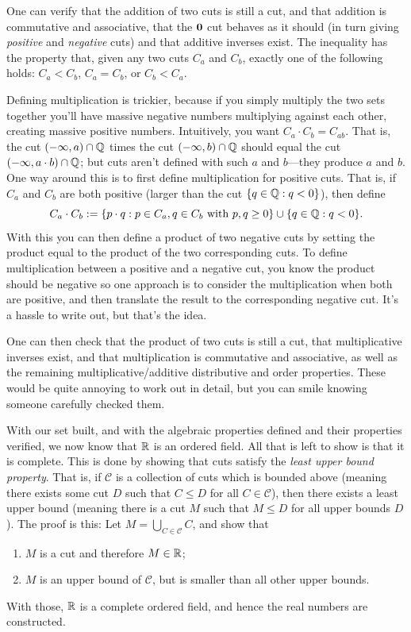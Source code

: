 \documentclass[11pt,twoside=off,numbers=noenddot]{scrbook}
\begin{document}
\begin{proofsketch}
    One can verify that the addition of two cuts is still a cut, and that addition is commutative and associative, that the $\textbf{0}$ cut behaves as it should (in turn giving \textit{positive} and \textit{negative} cuts) and that additive inverses exist. The inequality has the property that, given any two cuts $C_a$ and $C_b$, exactly one of the following holds: $C_a < C_b$, $C_a = C_b$, or $C_b < C_a$.

    Defining multiplication is trickier, because if you simply multiply the two sets together you'll have massive negative numbers multiplying against each other, creating massive positive numbers. Intuitively, you want $C_a \cdot C_b = C_{ab}$. That is, the cut $(-\infty, a) \cap \mathbb Q$ times the cut $(-\infty, b) \cap \mathbb Q$ should equal the cut $(-\infty, a \cdot b) \cap \mathbb Q$; but cuts aren't defined with such $a$ and $b$—they produce $a$ and $b$. One way around this is to first define multiplication for positive cuts. That is, if $C_a$ and $C_b$ are both positive (larger than the cut $\{ q \in \mathbb Q : q < 0 \}$), then define
    \[ C_a \cdot C_b := \{ p \cdot q : p \in C_a, q \in C_b \text{ with } p, q \geq 0 \} \cup \{ q \in \mathbb Q : q < 0 \}. \]
    With this you can then define a product of two negative cuts by setting the product equal to the product of the two corresponding cuts. To define multiplication between a positive and a negative cut, you know the product should be negative so one approach is to consider the multiplication when both are positive, and then translate the result to the corresponding negative cut. It's a hassle to write out, but that's the idea.

    One can then check that the product of two cuts is still a cut, that multiplicative inverses exist, and that multiplication is commutative and associative, as well as the remaining multiplicative/additive distributive and order properties. These would be quite annoying to work out in detail, but you can smile knowing someone carefully checked them.

    With our set built, and with the algebraic properties defined and their properties verified, we now know that $\mathbb R$ is an ordered field. All that is left to show is that it is complete. This is done by showing that cuts satisfy the \textit{least upper bound property}. That is, if $\mathcal{C}$ is a collection of cuts which is bounded above (meaning there exists some cut $D$ such that $C \leq D$ for all $C \in \mathcal{C}$), then there exists a least upper bound (meaning there is a cut $M$ such that $M \leq D$ for all upper bounds $D$). The proof is this: Let $M = \bigcup_{C \in \mathcal{C}} C$, and show that
    \begin{enumerate}
        \item $M$ is a cut and therefore $M \in \mathbb R$;
        \item $M$ is an upper bound of $\mathcal{C}$, but is smaller than all other upper bounds.
    \end{enumerate}
    With those, $\mathbb R$ is a complete ordered field, and hence the real numbers are constructed.
\end{proofsketch}
\end{document}
